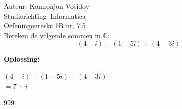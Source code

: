 \documentclass[a4paper]{article}
\begin{document}
	
	\noindent \large Auteur: Komronjon Vosidov \\
	\noindent \large Studierichting: Informatica\\
	\noindent \large Oefeningenreeks 1B nr. 7.5\\
	
	
	
	\normalsize
	Bereken de volgende sommen in $\mathbb{C}$:
	\begin{equation*}
		 (4-i)-(1-5i)+(4-3i)
	\end{equation*}
	
	
	\noindent \textbf{Oplossing:}
	
	$(4-i)-(1-5i)+(4-3i)$ \\	
	
	$= 7+i$ \\
	
	
\begin{thebibliography}{999}
	
\end{thebibliography}	
	
\end{document}
